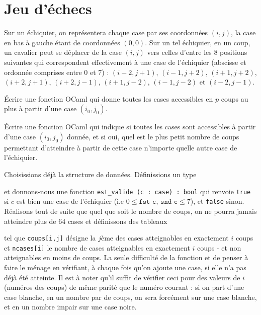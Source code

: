 \newcommand{\SourceFile}{1-parcours-de-tableaux/src/1-1.ml}
\section{Jeu d'échecs}

Sur un échiquier, on représentera chaque case par ses coordonnées $(i, j)$, la case en bas à gauche étant de coordonnées $(0, 0)$. Sur un tel échiquier, en un coup, un cavalier peut se déplacer de la case $(i, j)$ vers celles d'entre les 8 positions suivantes qui correspondent effectivement à une case de l'échiquier (abscisse et ordonnée comprises entre 0 et 7) : $(i-2, j+1)$, $(i-1, j+2)$, $(i+1, j+2)$, $(i+2, j+1)$, $(i+2, j -1)$, $(i+1, j-2)$, $(i-1, j-2)$ et $(i-2,j-1)$.

\Q
Écrire une fonction OCaml qui donne toutes les cases accessibles en $p$ coups au plus à partir d'une case $(i_0, j_0)$.

\Q
Écrire une fonction OCaml qui indique si toutes les cases sont accessibles à partir d'une case $(i_0, j_0)$ donnée, et si oui, quel est le plus petit nombre de coups permettant d'atteindre à partir de cette case n'importe quelle autre case de l'échiquier.

\Corrige

\Q
Choisissions déjà la structure de données. Définissions un type



et donnons-nous une fonction \texttt{est\_valide (c : case) : bool} qui renvoie \texttt{true} si $c$ est bien une case de l'échiquier (i.e $0\leq \texttt{fst c}$, $\texttt{snd c} \leq 7$), et \texttt{false} sinon. Réalisons tout de suite que quel que soit le nombre de coups, on ne pourra jamais atteindre plus de 64 cases et définissons des tableaux



tel que \texttt{coups[i,j]} désigne la $j$ème des cases atteignables en exactement $i$ coups et \texttt{ncases[i]} le nombre de cases atteignables en exactement $i$ coups - et non atteignables en moins de coups. La seule difficulté de la fonction et de penser à \og faire le ménage \fg en vérifiant, à chaque fois qu'on ajoute une case, si elle n'a pas déjà été atteinte. Il est à noter qu'il suffit de vérifier ceci pour des valeurs de $i$ (numéros des coups) de même parité que le numéro courant : si on part d'une case blanche, en un nombre par de coups, on sera forcément sur une case blanche, et en un nombre impair sur une case noire.

